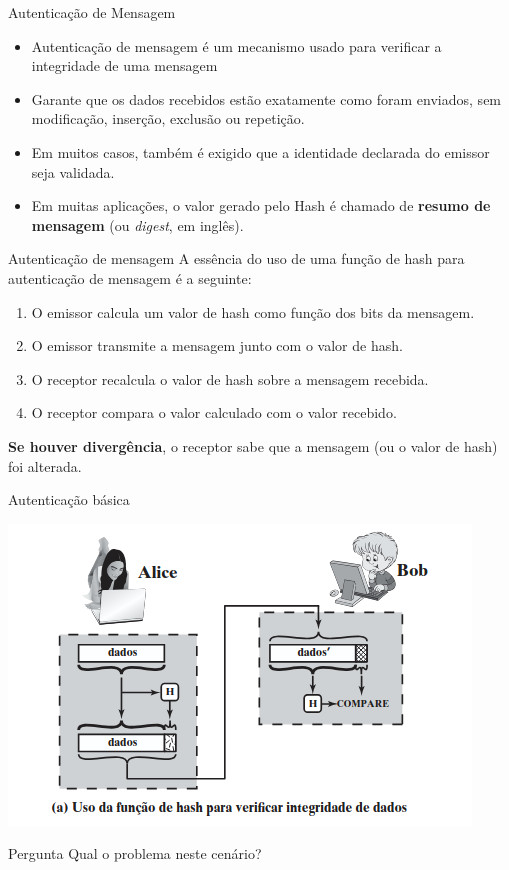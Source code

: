 \begin{frame}{Autenticação de Mensagem}
\begin{itemize}

    \item Autenticação de mensagem é um mecanismo usado para verificar a integridade de uma mensagem

    \item Garante que os dados recebidos estão exatamente como foram enviados, sem modificação, inserção, exclusão ou repetição.  


    \item Em muitos casos, também é exigido que a identidade declarada do emissor seja validada.  

    \item Em muitas aplicações, o valor gerado pelo Hash  é chamado de \textbf{resumo de mensagem} (ou \textit{digest}, em inglês).

    
\end{itemize}
\end{frame}

\begin{frame}{Autenticação de mensagem}
A essência do uso de uma função de hash para autenticação de mensagem é a seguinte: 

\begin{enumerate}
    \item O emissor calcula um valor de hash como função dos bits da mensagem.
    \item O emissor transmite a mensagem junto com o valor de hash.
    \item O receptor recalcula o valor de hash sobre a mensagem recebida.
    \item O receptor compara o valor calculado com o valor recebido.
\end{enumerate}

\textbf{Se houver divergência}, o receptor sabe que a mensagem (ou o valor de hash) foi alterada.
\end{frame}

\begin{frame}{Autenticação básica}

\centering
\includegraphics[width=0.6\linewidth]{Figuras/autenticacao-basica.png}

\begin{block}{Pergunta}
Qual o problema neste cenário?
\end{block}
\end{frame}

